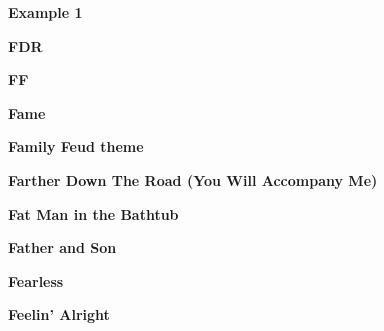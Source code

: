 \begin{center}\textbf{Example 1}\end{center}
\newline
\vspace{10pt} 
\begin{center}\textbf{FDR}\end{center}
\newline
\vspace{10pt} 
\begin{center}\textbf{FF}\end{center}
\newline
\vspace{10pt} 
\begin{center}\textbf{Fame}\end{center}
\newline
\vspace{10pt} 
\begin{center}\textbf{Family Feud theme}\end{center}
\newline
\vspace{10pt} 
\begin{center}\textbf{Farther Down The Road (You Will Accompany Me)}\end{center}
\newline
\vspace{10pt} 
\begin{center}\textbf{Fat Man in the Bathtub}\end{center}
\newline
\vspace{10pt} 
\begin{center}\textbf{Father and Son}\end{center}
\newline
\vspace{10pt} 
\begin{center}\textbf{Fearless}\end{center}
\newline
\vspace{10pt} 
\begin{center}\textbf{Feelin' Alright}\end{center}
